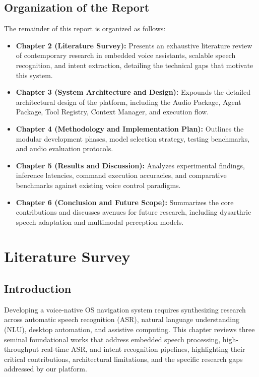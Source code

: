 \documentclass[12pt,a4paper]{report}
\begin{document}
\section{Organization of the Report}
The remainder of this report is organized as follows:
\begin{itemize}
    \item \textbf{Chapter 2 (Literature Survey):} Presents an exhaustive literature review of contemporary research in embedded voice assistants, scalable speech recognition, and intent extraction, detailing the technical gaps that motivate this system.
    \item \textbf{Chapter 3 (System Architecture and Design):} Expounds the detailed architectural design of the platform, including the Audio Package, Agent Package, Tool Registry, Context Manager, and execution flow.
    \item \textbf{Chapter 4 (Methodology and Implementation Plan):} Outlines the modular development phases, model selection strategy, testing benchmarks, and audio evaluation protocols.
    \item \textbf{Chapter 5 (Results and Discussion):} Analyzes experimental findings, inference latencies, command execution accuracies, and comparative benchmarks against existing voice control paradigms.
    \item \textbf{Chapter 6 (Conclusion and Future Scope):} Summarizes the core contributions and discusses avenues for future research, including dysarthric speech adaptation and multimodal perception models.
\end{itemize}


\chapter{Literature Survey}
\label{chap:lit_review}

\section{Introduction}
Developing a voice-native OS navigation system requires synthesizing research across automatic speech recognition (ASR), natural language understanding (NLU), desktop automation, and assistive computing. This chapter reviews three seminal foundational works that address embedded speech processing, high-throughput real-time ASR, and intent recognition pipelines, highlighting their critical contributions, architectural limitations, and the specific research gaps addressed by our platform.
\end{document}
